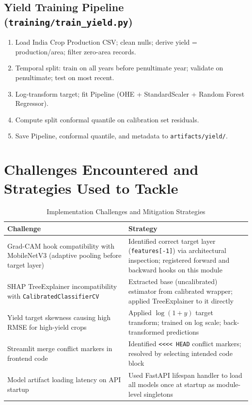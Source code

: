 \documentclass[12pt,a4paper]{report}
\begin{document}
\subsection{Yield Training Pipeline (\texttt{training/train\_yield.py})}
\begin{enumerate}[leftmargin=*]
  \item Load India Crop Production CSV; clean nulls; derive yield = production/area; filter zero-area records.
  \item Temporal split: train on all years before penultimate year; validate on penultimate; test on most recent.
  \item Log-transform target; fit Pipeline (OHE + StandardScaler + Random Forest Regressor).
  \item Compute split conformal quantile on calibration set residuals.
  \item Save Pipeline, conformal quantile, and metadata to \texttt{artifacts/yield/}.
\end{enumerate}

\section{Challenges Encountered and Strategies Used to Tackle}
\begin{table}[h!]
\centering
\renewcommand{\arraystretch}{1.3}
\caption{Implementation Challenges and Mitigation Strategies}
\label{tab:challenges}
\begin{tabular}{|L{5.5cm}|L{7cm}|}
\hline
\textbf{Challenge} & \textbf{Strategy} \\
\hline
Grad-CAM hook compatibility with MobileNetV3 (adaptive pooling before target layer) & Identified correct target layer (\texttt{features[-1]}) via architectural inspection; registered forward and backward hooks on this module \\
\hline
SHAP TreeExplainer incompatibility with \texttt{CalibratedClassifierCV} & Extracted base (uncalibrated) estimator from calibrated wrapper; applied TreeExplainer to it directly \\
\hline
Yield target skewness causing high RMSE for high-yield crops & Applied $\log(1+y)$ target transform; trained on log scale; back-transformed predictions \\
\hline
Streamlit merge conflict markers in frontend code & Identified \texttt{<<<< HEAD} conflict markers; resolved by selecting intended code block \\
\hline
Model artifact loading latency on API startup & Used FastAPI lifespan handler to load all models once at startup as module-level singletons \\
\hline
\end{tabular}
\end{table}
\end{document}
